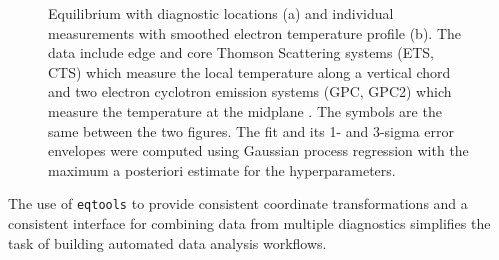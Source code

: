 \documentclass{elsarticle}
\newcommand{\eqtools}{\texttt{eqtools}\xspace}
\begin{document}
\begin{figure}
	\caption{Equilibrium with diagnostic locations (a) and individual measurements with smoothed electron temperature profile (b). The data include edge \cite{Hughes2003} and core \cite{Hughes2001} Thomson Scattering systems (ETS, CTS) which measure the local temperature along a vertical chord and two electron cyclotron emission systems (GPC, GPC2) which measure the temperature at the midplane \cite{Basse2007}. The symbols are the same between the two figures. The fit and its 1- and 3-sigma error envelopes were computed using Gaussian process regression with the maximum a posteriori estimate for the hyperparameters.}
	\label{fig:profiledemo}
\end{figure}
The use of \eqtools to provide consistent coordinate transformations and a consistent interface for combining data from multiple diagnostics simplifies the task of building automated data analysis workflows.
\end{document}

